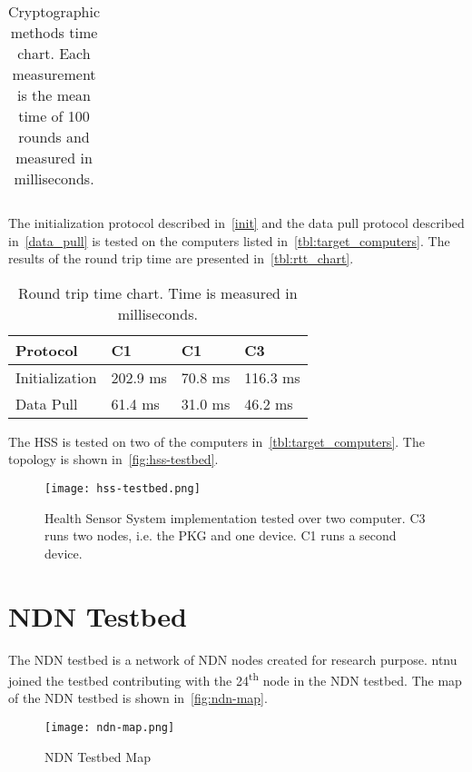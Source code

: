 \begin{table}[h]
\begin{tabular}[c]{lllll}
  \end{tabular}
  \caption{Cryptographic methods time chart. Each measurement is the mean time of 100 rounds and measured in milliseconds. }
  \label{tbl:time_chart}
\end{table}


The initialization protocol described in~\autoref{init} and the data pull protocol described in~\autoref{data_pull} is tested on the computers listed in~\autoref{tbl:target_computers}.
The results of the round trip time are presented in~\autoref{tbl:rtt_chart}.
\begin{table}[h]
  \begin{tabular}[c]{p{}p{}p{}p{}}
  Protocol                                & C1            & C1            & C3            \\ \hline
  Initialization                          & 202.9 ms      & 70.8 ms       & 116.3 ms     \\ %
  Data Pull                               & 61.4 ms       & 31.0 ms       & 46.2 ms     \\ %
  \end{tabular}
  \caption{Round trip time chart. Time is measured in milliseconds.}
  \label{tbl:rtt_chart}
\end{table}

The \gls{HSS} is tested on two of the computers in~\autoref{tbl:target_computers}.
The topology is shown in~\autoref{fig:hss-testbed}.
\begin{figure}[ht]
  \centering
  \texttt{[image: hss-testbed.png]}
  \caption{Health Sensor System implementation tested over two computer. C3 runs two nodes, i.e. the PKG and one device. C1 runs a second device.}
  \label{fig:hss-testbed}
\end{figure}

\section{NDN Testbed}
The \gls{NDN} testbed is a network of \gls{NDN} nodes created for research purpose. 
\gls{ntnu} joined the testbed contributing with the 24\textsuperscript{th} node in the NDN testbed.
The map of the NDN testbed is shown in~\autoref{fig:ndn-map}.

\begin{figure}[ht]
  \centering
  \texttt{[image: ndn-map.png]}
  \caption{NDN Testbed Map}
  \label{fig:ndn-map}
\end{figure}
